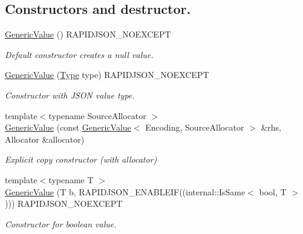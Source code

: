 \subsection*{Constructors and destructor.}
\begin{DoxyCompactItemize}
\item 
\mbox{\label{class_generic_value_ab0205d57176d83814ea4e4598c596fe8}} 
\hyperlink{class_generic_value_ab0205d57176d83814ea4e4598c596fe8}{Generic\+Value} () R\+A\+P\+I\+D\+J\+S\+O\+N\+\_\+\+N\+O\+E\+X\+C\+E\+PT
\begin{DoxyCompactList}\small\item\em Default constructor creates a null value. \end{DoxyCompactList}\item 
\hyperlink{class_generic_value_a83c8f84b8e61f2f40414b703b75aea61}{Generic\+Value} (\hyperlink{rapidjson_8h_a1d1cfd8ffb84e947f82999c682b666a7}{Type} type) R\+A\+P\+I\+D\+J\+S\+O\+N\+\_\+\+N\+O\+E\+X\+C\+E\+PT
\begin{DoxyCompactList}\small\item\em Constructor with J\+S\+ON value type. \end{DoxyCompactList}\item 
{\footnotesize template$<$typename Source\+Allocator $>$ }\\\hyperlink{class_generic_value_a5161c0c98ba9144c50a38acde28a5ede}{Generic\+Value} (const \hyperlink{class_generic_value}{Generic\+Value}$<$ Encoding, Source\+Allocator $>$ \&rhs, Allocator \&allocator)
\begin{DoxyCompactList}\small\item\em Explicit copy constructor (with allocator) \end{DoxyCompactList}\item 
{\footnotesize template$<$typename T $>$ }\\\hyperlink{class_generic_value_a0f6a0394bfffaedde88e433b2265194c}{Generic\+Value} (T b, R\+A\+P\+I\+D\+J\+S\+O\+N\+\_\+\+E\+N\+A\+B\+L\+E\+IF((internal\+::\+Is\+Same$<$ bool, T $>$))) R\+A\+P\+I\+D\+J\+S\+O\+N\+\_\+\+N\+O\+E\+X\+C\+E\+PT
\begin{DoxyCompactList}\small\item\em Constructor for boolean value. \end{DoxyCompactList}\item 
\mbox{\label{class_generic_value_aafc754ade38421c179f5c8933ecbaf45}} 

\end{DoxyCompactItemize}
